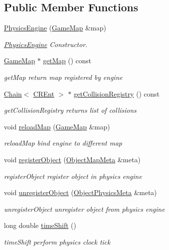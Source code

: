 \subsection*{Public Member Functions}
\begin{DoxyCompactItemize}
\item 
\hyperlink{classPhysicsEngine_abc458126ff199c01fe04bbc910f2190d}{Physics\+Engine} (\hyperlink{classGameMap}{Game\+Map} \&map)
\begin{DoxyCompactList}\small\item\em \hyperlink{classPhysicsEngine}{Physics\+Engine} Constructor. \end{DoxyCompactList}\item 
\hyperlink{classGameMap}{Game\+Map} $\ast$ \hyperlink{classPhysicsEngine_abe9b7fec2565129365490d4d09ab91fb}{get\+Map} () const 
\begin{DoxyCompactList}\small\item\em get\+Map return map registered by engine \end{DoxyCompactList}\item 
\hyperlink{classChain}{Chain}$<$ \hyperlink{structPhysicsEngine_1_1CREnt}{C\+R\+Ent} $>$ $\ast$ \hyperlink{classPhysicsEngine_a52a90ad6bdd5706c6fe89254991330c6}{get\+Collision\+Registry} () const 
\begin{DoxyCompactList}\small\item\em get\+Collision\+Registry returns list of collisions \end{DoxyCompactList}\item 
void \hyperlink{classPhysicsEngine_a37d4d1483678921775e0bc545fc8e0b0}{reload\+Map} (\hyperlink{classGameMap}{Game\+Map} \&map)
\begin{DoxyCompactList}\small\item\em reload\+Map bind engine to different map \end{DoxyCompactList}\item 
void \hyperlink{classPhysicsEngine_ac6d56b0524f4c020463dd6dbbd9dcdc1}{register\+Object} (\hyperlink{classObjectMapMeta}{Object\+Map\+Meta} \&meta)
\begin{DoxyCompactList}\small\item\em register\+Object register object in physics engine \end{DoxyCompactList}\item 
void \hyperlink{classPhysicsEngine_a323e3de1fd9aa734b84fb62a9496f2e2}{unregister\+Object} (\hyperlink{classObjectPhysicsMeta}{Object\+Physics\+Meta} \&meta)
\begin{DoxyCompactList}\small\item\em unregister\+Object unregister object from physics engine \end{DoxyCompactList}\item 
long double \hyperlink{classPhysicsEngine_a71be5c7bd4b8f50a78a3618b57cb0e84}{time\+Shift} ()
\begin{DoxyCompactList}\small\item\em time\+Shift perform physics clock tick \end{DoxyCompactList}\end{DoxyCompactItemize}


